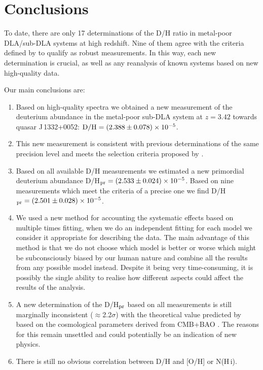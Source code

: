 \documentclass[fleqn,usenatbib]{mnras}
\newcommand{\PN}[2][]{{\color{orange} PN:\st{#1}~#2}}  %
\newcommand{\HI}[0]{H\,{\sc i}}
\begin{document}
\section{Conclusions}

To date, there are only 17 determinations of the D/H ratio in metal-poor DLA/sub-DLA systems at high redshift. Nine of them agree with the criteria defined by \citet{Cooke_2014} to qualify as robust measurements. In this way, each new determination is crucial, as well as any reanalysis of known systems based on new high-quality data.

Our main conclusions are:
\begin{enumerate}
    \item Based on high-quality spectra we obtained a new measurement of the  deuterium abundance in the metal-poor sub-DLA system at $z = 3.42$ towards
quasar J\,1332+0052: ${\rm D/H}=(2.388 \pm 0.078)\times 10^{-5}$.
    \item This new measurement is consistent with previous determinations of the same precision level and meets the selection criteria proposed by \cite{Cooke_2014}.
    \item Based on all available D/H measurements we estimated a new primordial deuterium abundance D/H$_{\rm pr}=(2.533 \pm 0.024)\times 10^{-5}$. Based on nine measurements which meet the criteria of a precise one we find D/H$_{\rm pr}=(2.501 \pm 0.028)\times 10^{-5}$. 
    \item We used a new method for accounting the systematic effects based on multiple times fitting, when we do an independent fitting for each model we consider it appropriate for describing the data. The main advantage of this method is that we do not choose which model is better or worse which might be subconsciously biased by our human nature and combine all the results from any possible model instead. Despite it being very time-consuming, it is possibly the single ability to realise how different aspects could affect the results of the analysis. 
    \item A new determination of the D/H$_{\rm pr}$ based on all measurements is still marginally inconsistent ($\approx$2.2$\sigma$) with the theoretical value predicted by \cite{Pitrou2021} based on the cosmological parameters derived from CMB+BAO \citep{PL18}. The reasons for this
    remain unsettled and
    could potentially be an indication of new physics.
    \item There is still no obvious correlation between D/H and [O/H] or N(\HI).
\end{enumerate}
\end{document}
